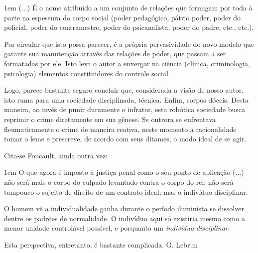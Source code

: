 \documentclass[12pt,a4paper]{article}
\newenvironment{citac}
{
	\begin{addmargin}
		[4cm]{1em} \footnotesize}{\normalfont 
	\end{addmargin}
}
\begin{document}
	\begin{citac}
		(...) É o nome atribuído a um conjunto de relações que 
		formigam por toda à parte na espessura do corpo social 
		(poder pedagógico, pátrio poder, poder do policial, poder 
		do contramestre, poder do psicanalista, poder do padre, 
		etc., etc.). %
	\end{citac}

	Por circular que isto possa parecer, é a própria pervasividade 
	do novo modelo que garante sua manutenção através das relações 
	de poder, que passam a ser formatadas por ele. Isto leva o 
	autor a enxergar na ciência (clínica, criminologia, psicologia) 
	elementos constituidores do controle social. 

	Logo, parece bastante seguro concluir que, considerada a visão de 
	nosso autor, isto ruma para uma sociedade disciplinada, técnica. 
	Enfim, corpos dóceis. Desta maneira, ao invés de punir duramente 
	o infrator, esta robótica sociedade busca reprimir o crime diretamente 
	em sua gênese. Se outrora se enfrentava fleumaticamente o crime 
	de maneira reativa, neste momento a racionalidade tomar o leme e 
	prescreve, de acordo com seus ditames, o modo ideal de se agir. 

	Cita-se Foucault, ainda outra vez: 

	\begin{citac}
		O que agora é imposto à justiça penal como o seu ponto de 
		aplicação (...) não será mais o corpo do culpado levantado 
		contra o corpo do rei; não será tampouco o sujeito de 
		direito de um contrato ideal; mas o indivíduo disciplinar. 
	\end{citac}

	O homem vê a individualidade ganha durante o período iluminista 
	se dissolver dentre os padrões de normalidade. O indivíduo aqui só 
	existiria mesmo como a menor unidade controlável possível, e porquanto 
	um \textit{indivíduo disciplinar}. 

	Esta perspectiva, entretanto, é bastante complicada. G. Lebrun




\end{document}
